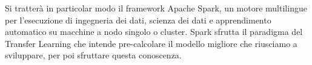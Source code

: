 {Si tratterà in particolar modo il framework Apache Spark, un motore multilingue per l'esecuzione di ingegneria dei dati, scienza dei dati e apprendimento automatico su macchine a nodo singolo o cluster. Spark sfrutta il paradigma del Transfer Learning che intende pre-calcolare il modello migliore che riusciamo a sviluppare, per poi sfruttare questa conoscenza.\\
}
\endabstract
